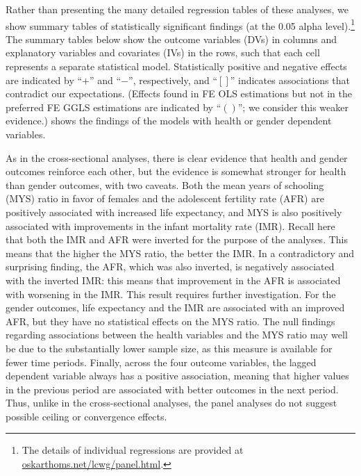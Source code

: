 \documentclass[12pt]{article}
\begin{document}

Rather than presenting the many detailed regression tables of these analyses, we show summary tables of statistically significant findings (at the 0.05 alpha level).\footnote{The details of individual regressions are provided at \href{oskarthoms.net/lcwg/}{oskarthoms.net/lcwg/panel.html}.}
The summary tables below show the outcome variables (DVs) in columns and explanatory variables and covariates (IVs) in the rows, such that each cell represents a separate statistical model. Statistically positive and negative effects are indicated by \enquote{$+$} and \enquote{$-$}, respectively, and \enquote{$[]$} indicates associations that contradict our expectations. (Effects found in FE OLS estimations but not in the preferred FE GGLS estimations are indicated by \enquote{$()$}; we consider this weaker evidence.)
 shows the findings of the models with health or gender dependent variables.



As in the cross-sectional analyses, there is clear evidence that health and gender outcomes reinforce each other, but the evidence is somewhat stronger for health than gender outcomes, with two caveats.
Both the mean years of schooling (MYS) ratio in favor of females and the adolescent fertility rate (AFR) are positively associated with increased life expectancy, and MYS is also positively associated with improvements in the infant mortality rate (IMR).
Recall here that both the IMR and AFR were inverted for the purpose of the analyses.
This means that the higher the MYS ratio, the better the IMR.
In a contradictory and surprising finding, the AFR, which was also inverted, is negatively associated with the inverted IMR: this means that improvement in the AFR is associated with worsening in the IMR. This result requires further investigation.
For the gender outcomes, life expectancy and the IMR are associated with an improved AFR, but they have no statistical effects on the MYS ratio.
The null findings regarding associations between the health variables and the MYS ratio may well be due to the substantially lower sample size, as this measure is available for fewer time periods.
Finally, across the four outcome variables, the lagged dependent variable always has a positive association, meaning that higher values in the previous period are associated with better outcomes in the next period. Thus, unlike in the cross-sectional analyses, the panel analyses do not suggest possible ceiling or convergence effects.
\end{document}
